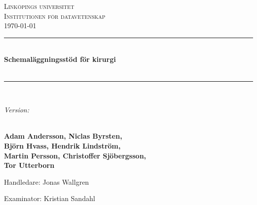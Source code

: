 \begin{titlepage} %
	\newcommand{\HRule}{\rule{\linewidth}{0.5mm}} %

	\center %


	\textsc{\LARGE Linköpings universitet \\ \vspace{0.2em} Institutionen för datavetenskap }\\[2cm]

    \large\today

    \vspace{1cm}



	\HRule\\[0.4cm]

	{\huge\bfseries Schemaläggningsstöd för  kirurgi \vspace{.1em} \\ \ftitle }\\[0.4cm] %

	\HRule\\[1cm]


	\begin{minipage}{0.7\textwidth}
			\large
            \emph{Version: \fversion}
            \vspace{1em}

            \textbf{\\Adam Andersson, Niclas Byrsten, \\Björn Hvass, Hendrik Lindström, \\Martin Persson, Christoffer Sjöbergsson, \\Tor Utterborn}


            \vspace{1em}

            Handledare: Jonas Wallgren

            Examinator: Kristian Sandahl
	\end{minipage}
	~




	\vfill %

\end{titlepage}


